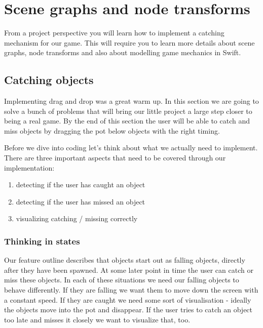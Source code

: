 \chapter{Scene graphs and node transforms}
From a project perspective you will learn how to implement a catching mechanism
for our game. This will require you to learn more details about scene graphs,
node transforms and also about modelling game mechanics in Swift.

\section{Catching objects}
Implementing drag and drop was a great warm up. In this section we are going to
solve a bunch of problems that will bring our little project a large step closer
to being a real game. By the end of this section the user will be able to catch
and miss objects by dragging the pot below objects with the right timing.

Before we dive into coding let's think about what we actually need to implement.
There are three important aspects that need to be covered through our
implementation:
\begin{enumerate}
  \item detecting if the user has caught an object
  \item detecting if the user has missed an object
  \item visualizing catching / missing correctly
\end{enumerate}

\subsection{Thinking in states}
Our feature outline describes that objects start out as falling objects,
directly after they have been spawned. At some later point in time the user can
catch or miss these objects. In each of these situations we need our falling objects to behave differently. If they are
falling we want them to move down the screen with a constant speed. If they are
caught we need some sort of visualisation - ideally the objects move into the
pot and disappear. If the user tries to catch an object too late and misses it
closely we want to visualize that, too.

